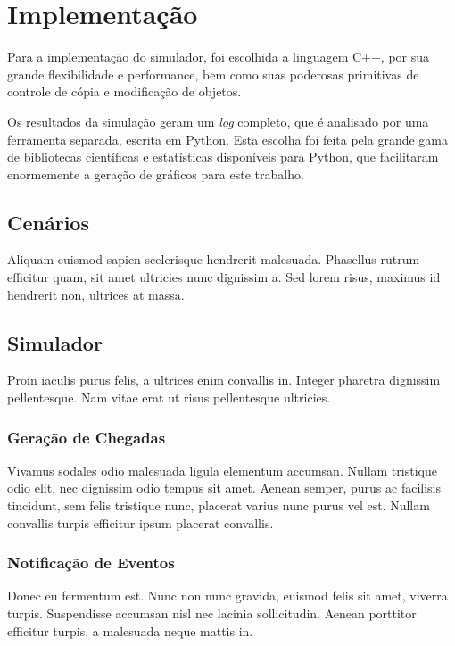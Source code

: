 \chapter{\label{chap:impl}Implementação}

Para a implementação do simulador, foi escolhida a linguagem C++, por sua grande
flexibilidade e performance, bem como suas poderosas primitivas de controle de
cópia e modificação de objetos.

Os resultados da simulação geram um \textit{log} completo, que é analisado por
uma ferramenta separada, escrita em Python. Esta escolha foi feita pela grande
gama de bibliotecas científicas e estatísticas disponíveis para Python, que
facilitaram enormemente a geração de gráficos para este trabalho.

\section{Cenários}

Aliquam euismod sapien scelerisque hendrerit malesuada. Phasellus rutrum
efficitur quam, sit amet ultricies nunc dignissim a. Sed lorem risus, maximus id
hendrerit non, ultrices at massa.

\section{Simulador}

Proin iaculis purus felis, a ultrices enim convallis in. Integer pharetra
dignissim pellentesque. Nam vitae erat ut risus pellentesque ultricies.

\subsection{Geração de Chegadas}

Vivamus sodales odio malesuada ligula elementum accumsan. Nullam tristique odio
elit, nec dignissim odio tempus sit amet. Aenean semper, purus ac facilisis
tincidunt, sem felis tristique nunc, placerat varius nunc purus vel est. Nullam
convallis turpis efficitur ipsum placerat convallis.

\subsection{Notificação de Eventos}

Donec eu fermentum est. Nunc non nunc gravida, euismod felis sit amet, viverra
turpis. Suspendisse accumsan nisl nec lacinia sollicitudin. Aenean porttitor
efficitur turpis, a malesuada neque mattis in.

